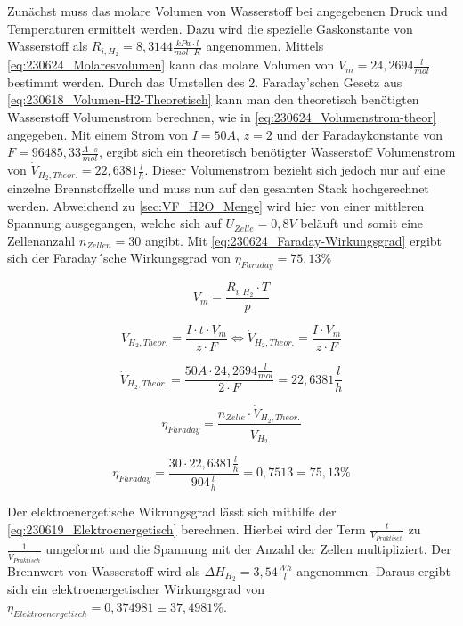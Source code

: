 
Zunächst muss das molare Volumen von Wasserstoff bei angegebenen Druck und Temperaturen ermittelt werden.
Dazu wird die spezielle Gaskonstante von Wasserstoff als $R_{i,H_2} = 8,3144 \frac{kPa \cdot l}{mol \cdot K}$ \cite{Gaskonstante} angenommen.
Mittels \autoref{eq:230624_Molaresvolumen} kann das molare Volumen von $V_m = 24,2694 \frac{l}{mol}$ bestimmt werden.
Durch das Umstellen des 2. Faraday'schen Gesetz aus \autoref{eq:230618_Volumen-H2-Theoretisch} kann man den theoretisch benötigten Wasserstoff Volumenstrom berechnen, wie in \autoref{eq:230624_Volumenstrom-theor} angegeben.
Mit einem Strom von $I = 50A$, $z = 2$ und der Faradaykonstante von $F = 96485,33 \frac{A \cdot s}{mol}$, ergibt sich ein theoretisch benötigter Wasserstoff Volumenstrom von $\dot{V}_{H_2,Theor.} = 22,6381 \frac{l}{h}$.
Dieser Volumenstrom bezieht sich jedoch nur auf eine einzelne Brennstoffzelle und muss nun auf den gesamten Stack hochgerechnet werden.
Abweichend zu \autoref{sec:VF_H2O_Menge} wird hier von einer mittleren Spannung ausgegangen, welche sich auf $U_{Zelle} = 0,8V$ beläuft und somit eine Zellenanzahl $n_{Zellen} = 30$ angibt.
Mit \autoref{eq:230624_Faraday-Wirkungsgrad} ergibt sich der Faraday´sche Wirkungsgrad von $\eta_{Faraday} = 75,13 \%$


\begin{equation}
    V_m = \frac{R_{i,H_2} \cdot T}{p}
    \label{eq:230624_Molaresvolumen}
\end{equation}

\begin{equation}
    V_{H_2,Theor.} = \frac{I \cdot t \cdot V_m}{z \cdot F} \Leftrightarrow  \dot{V}_{H_2,Theor.} = \frac{I \cdot V_m}{z \cdot F}
    \label{eq:230624_Volumenstrom-theor}
\end{equation}

$$\dot{V}_{H_2,Theor.} = \frac{50 A \cdot 24,2694 \frac{l}{mol}}{2 \cdot F}= 22,6381 \frac{l}{h}$$

\begin{equation}
    \eta_{Faraday} = \frac{n_{Zelle} \cdot \dot{V}_{H_2,Theor.}}{\dot{V}_{H_2}}
    \label{eq:230624_Faraday-Wirkungsgrad}
\end{equation}

$$\eta_{Faraday} = \frac{30 \cdot 22,6381 \frac{l}{h}}{904 \frac{l}{h}}= 0,7513=75,13\%$$


Der elektroenergetische Wikrungsgrad lässt sich mithilfe der \autoref{eq:230619_Elektroenergetisch} berechnen.
Hierbei wird der Term $\frac{t}{V_{Praktisch}}$ zu $\frac{1}{\dot{V}_{Praktisch}}$ umgeformt und die Spannung mit der Anzahl der Zellen multipliziert.
Der Brennwert von Wasserstoff wird als $\Delta H_{H_2} = 3,54\frac{Wh}{l}$ \cite{dH-H2} angenommen.
Daraus ergibt sich ein elektroenergetischer Wirkungsgrad von $\eta_{Elektroenergetisch} = 0,374981 \equiv 37,4981 \%$.

